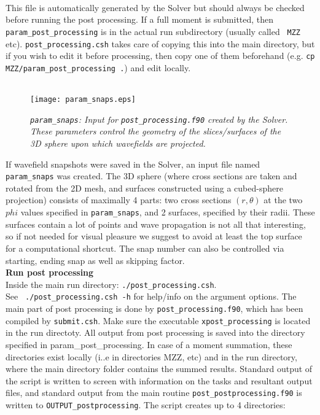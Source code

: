 \documentclass[11pt,letter,fleqn,english,notitlepage]{article}
\begin{document}
\\
This file is automatically generated by the Solver but should always be checked
before running the post processing.  If a full moment is submitted, then {\tt
param\_post\_processing} is in the actual run subdirectory (usually called {\tt
MZZ} etc).  {\tt post\_processing.csh} takes care of copying this into the main
directory, but if you wish to edit it before processing, then copy one of them
beforehand (e.g. {\tt cp MZZ/param\_post\_processing .}) and edit locally.\\

\\
\begin{figure*}[htb]
\begin{center}
\texttt{[image: param\_snaps.eps]}
\caption{\textit{{\tt param\_snaps}: Input for {\tt post\_processing.f90} created by the Solver. These parameters 
control the geometry of the slices/surfaces of the 3D sphere upon which wavefields are projected.  }}
\end{center}
\end{figure*}

\noindent 
If wavefield snapshots were saved in the Solver, an input file named {\tt
param\_snaps} was created.  The 3D sphere (where cross sections are taken and
rotated from the 2D mesh, and surfaces constructed using a cubed-sphere
projection) consists of maximally 4 parts: two cross sections $(r,\theta)$ at
the two $phi$ values specified in {\tt param\_snaps}, and 2 surfaces, specified
by their radii. These surfaces contain a lot of points and wave propagation is
not all that interesting, so if not needed for visual pleasure we suggest to
avoid at least the top surface for a computational shortcut. The snap number
can also be controlled via starting, ending snap as well as skipping factor. \\

\noindent \textbf{Run post processing}\\
Inside the main run directory: {\tt ./post\_processing.csh}.\\ See {\tt
./post\_processing.csh -h} for help/info on the argument options. The main part
of post processing is done by {\tt post\_processing.f90}, which has been
compiled by {\tt submit.csh}. Make sure the executable {\tt xpost\_processing}
is located in the run directoty.  All output from post processing is saved into
the directory specified in param\_post\_processing.  In case of a moment
summation, these directories exist locally (i..e in directories MZZ, etc) and
in the run directory, where the main directory folder contains the summed
results. Standard output of the script is written to screen with information on
the tasks and resultant output files, and standard output from the main routine
{\tt post\_postprocessing.f90} is written to {\tt OUTPUT\_postprocessing}. The
script creates up to 4 directories: 
\end{document}
